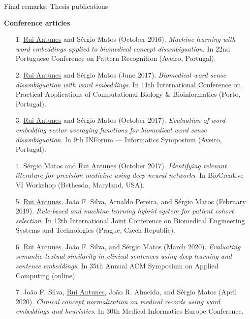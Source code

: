 \begin{frame}[t]{Final remarks: Thesis publications}
\begin{itemize}
\end{itemize}

\vspace*{3mm}

\textbf{\minorscriptsize Conference articles}

\begin{itemize}

\item[1.]
\underline{Rui Antunes} and Sérgio Matos (October 2016). %
\textit{Machine learning with word embeddings applied to biomedical concept disambiguation}.
In 22nd Portuguese Conference on Pattern Recognition (Aveiro, Portugal).

\item[2.]
\underline{Rui Antunes} and Sérgio Matos (June 2017). %
\textit{Biomedical word sense disambiguation with word embeddings}.
In 11th International Conference on Practical Applications of Computational Biology \& Bioinformatics (Porto, Portugal).

\item[3.]
\underline{Rui Antunes} and Sérgio Matos (October 2017). %
\textit{Evaluation of word embedding vector averaging functions for biomedical word sense disambiguation}.
In 9th INForum --- Informatics Symposium (Aveiro, Portugal).

\item[4.]
Sérgio Matos and \underline{Rui Antunes} (October 2017). %
\textit{Identifying relevant literature for precision medicine using deep neural networks}.
In BioCreative VI Workshop (Bethesda, Maryland, USA).

\item[5.]
\underline{Rui Antunes}, João F. Silva, Arnaldo Pereira, and Sérgio Matos (February 2019). %
\textit{Rule-based and machine learning hybrid system for patient cohort selection}.
In 12th International Joint Conference on Biomedical Engineering Systems and Technologies (Prague, Czech Republic).

\item[6.]
\underline{Rui Antunes}, João F. Silva, and Sérgio Matos (March 2020). %
\textit{Evaluating semantic textual similarity in clinical sentences using deep learning and sentence embeddings}.
In 35th Annual ACM Symposium on Applied Computing (online).

\item[7.]
João F. Silva, \underline{Rui Antunes}, João R. Almeida, and Sérgio Matos (April 2020). %
\textit{Clinical concept normalization on medical records using word embeddings and heuristics}.
In 30th Medical Informatics Europe Conference.%

\end{itemize}

\end{frame}
